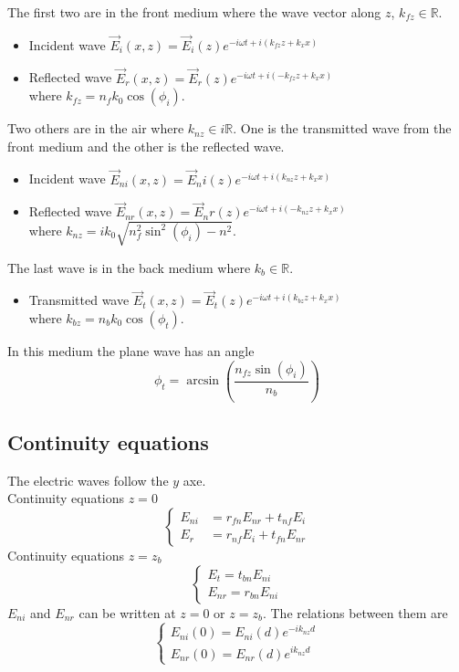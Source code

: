 The first two are in the front medium where the wave vector along $z$, $k_{fz}\in \mathbb{R}$.
\begin{itemize}
\item  Incident wave  $\vec{E}_i(x,z)=\vec{E}_i(z)e^{-i\omega t+i(k_{fz}z+k_xx)}$
\item Reflected wave  $\vec{E}_r(x,z)=\vec{E}_r(z)e^{-i\omega t+i(-k_{fz}z+k_xx)}$\\
where $k_{fz}=n_fk_0\cos(\phi _i)$.
\end{itemize}
Two others are in the air where $k_{nz}\in i\mathbb{R}$. One is the transmitted wave from the front medium and the other is the reflected wave.
\begin{itemize}
\item Incident wave 
$\vec{E}_{ni}(x,z)=\vec{E}_ni(z)e^{-i\omega t+i(k_{nz}z+k_xx)}$
\item Reflected wave 
$\vec{E}_{nr}(x,z)=\vec{E}_nr(z)e^{-i\omega t+i(-k_{nz}z+k_xx)}$\\
where $k_{nz}=ik_0\sqrt{n_f^2\sin^2(\phi _i)-n^2}$.
\end{itemize}
The last wave is in the back medium where $k_{b}\in \mathbb{R}$.
\begin{itemize}
\item Transmitted wave
$\vec{E}_t(x,z)=\vec{E}_t(z)e^{-i\omega t+i(k_{bz}z+k_xx)}$\\
where $k_{bz}=n_bk_0\cos(\phi _t)$.
\end{itemize}
In this medium the plane wave has an angle \\
$$
\phi_t=\arcsin (\frac{n_{fz}\sin(\phi_i)}{n_b})
$$

\subsection{Continuity equations} 
The electric waves follow the $y$ axe.\\
Continuity equations $z=0$
\begin{equation}
\left\lbrace
\begin{array}{ccc}\label{eq:continuity0}
E_{ni}&=r_{fn}E_{nr}+t_{nf}E_i\\
E_r&=r_{nf}E_{i}+t_{fn}E_{nr}
\end{array}\right.
\end{equation}
Continuity equations $z=z_b$
\begin{equation}
\left\lbrace
\begin{array}{ccc}\label{eq:continuityd}
E_t=t_{bn}E_{ni}\\
E_{nr}=r_{bn}E_{ni}
\end{array}\right.
\end{equation}
$E_{ni}$ and $E_{nr}$ can be written at $z=0$ or $z=z_b$. The relations between them are
\begin{equation}
\left\lbrace
\begin{array}{ccc}\label{eq:0tod}
E_{ni}(0)=E_{ni}(d)e^{-ik_{nz}d}\\
E_{nr}(0)=E_{nr}(d)e^{ik_{nz}d}
\end{array}\right.
\end{equation}

